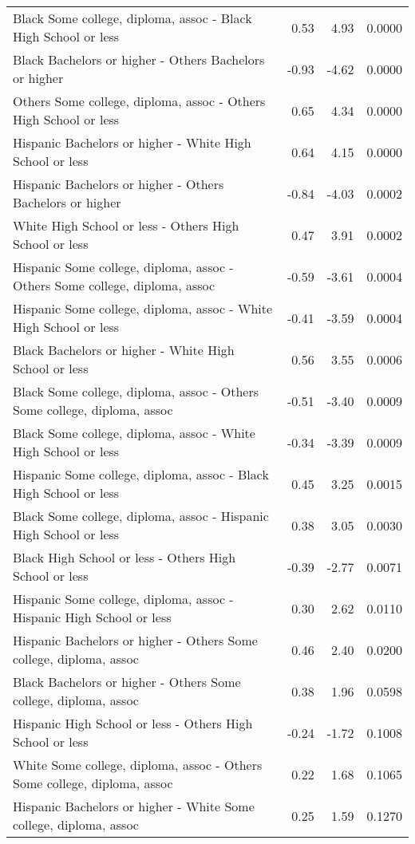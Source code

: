 \begin{center}
\begin{longtable}{lrrr}
    Black Some college, diploma, assoc -  Black High School or less & 0.53 & 4.93 & 0.0000 \\ 
    Black Bachelors or higher -  Others Bachelors or higher & -0.93 & -4.62 & 0.0000 \\ 
    Others Some college, diploma, assoc -  Others High School or less & 0.65 & 4.34 & 0.0000 \\ 
    Hispanic Bachelors or higher -  White High School or less & 0.64 & 4.15 & 0.0000 \\ 
    Hispanic Bachelors or higher -  Others Bachelors or higher & -0.84 & -4.03 & 0.0002 \\ 
    White High School or less -  Others High School or less & 0.47 & 3.91 & 0.0002 \\ 
    Hispanic Some college, diploma, assoc -  Others Some college, diploma, assoc & -0.59 & -3.61 & 0.0004 \\ 
    Hispanic Some college, diploma, assoc -  White High School or less & -0.41 & -3.59 & 0.0004 \\ 
    Black Bachelors or higher -  White High School or less & 0.56 & 3.55 & 0.0006 \\ 
    Black Some college, diploma, assoc -  Others Some college, diploma, assoc & -0.51 & -3.40 & 0.0009 \\ 
    Black Some college, diploma, assoc -  White High School or less & -0.34 & -3.39 & 0.0009 \\ 
    Hispanic Some college, diploma, assoc -  Black High School or less & 0.45 & 3.25 & 0.0015 \\ 
    Black Some college, diploma, assoc -  Hispanic High School or less & 0.38 & 3.05 & 0.0030 \\ 
    Black High School or less -  Others High School or less & -0.39 & -2.77 & 0.0071 \\ 
    Hispanic Some college, diploma, assoc -  Hispanic High School or less & 0.30 & 2.62 & 0.0110 \\ 
    Hispanic Bachelors or higher -  Others Some college, diploma, assoc & 0.46 & 2.40 & 0.0200 \\ 
    Black Bachelors or higher -  Others Some college, diploma, assoc & 0.38 & 1.96 & 0.0598 \\ 
    Hispanic High School or less -  Others High School or less & -0.24 & -1.72 & 0.1008 \\ 
    White Some college, diploma, assoc -  Others Some college, diploma, assoc & 0.22 & 1.68 & 0.1065 \\ 
    Hispanic Bachelors or higher -  White Some college, diploma, assoc & 0.25 & 1.59 & 0.1270 \\ 

\end{longtable}
\end{center}
